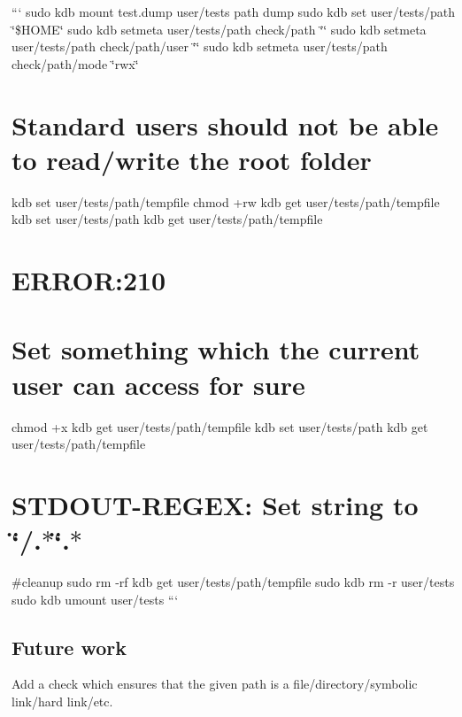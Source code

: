 ``` sudo kdb mount test.\+dump user/tests path dump sudo kdb set user/tests/path \char`\"{}\$\+H\+O\+M\+E\char`\"{} sudo kdb setmeta user/tests/path check/path \char`\"{}\char`\"{} sudo kdb setmeta user/tests/path check/path/user \char`\"{}\char`\"{} sudo kdb setmeta user/tests/path check/path/mode \char`\"{}rwx\char`\"{}

\section*{Standard users should not be able to read/write the root folder}

kdb set user/tests/path/tempfile  chmod +rw {\ttfamily kdb get user/tests/path/tempfile} kdb set user/tests/path {\ttfamily kdb get user/tests/path/tempfile} \section*{E\+R\+R\+OR\+:210}

\section*{Set something which the current user can access for sure}

chmod +x {\ttfamily kdb get user/tests/path/tempfile} kdb set user/tests/path {\ttfamily kdb get user/tests/path/tempfile} \section*{S\+T\+D\+O\+U\+T-\/\+R\+E\+G\+EX\+: Set string to \char`\"{}/.$\ast$\char`\"{}.$\ast$}

\#cleanup sudo rm -\/rf {\ttfamily kdb get user/tests/path/tempfile} sudo kdb rm -\/r user/tests sudo kdb umount user/tests ```

\subsection*{Future work}

Add a check which ensures that the given path is a file/directory/symbolic link/hard link/etc. 